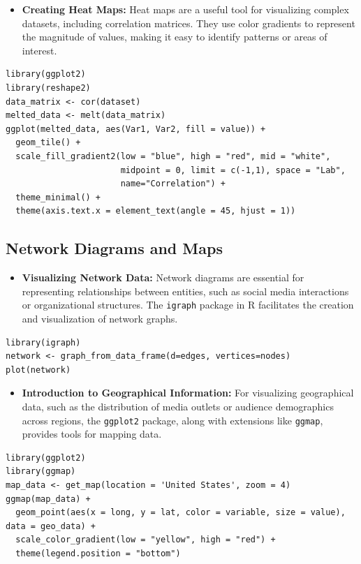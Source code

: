 \documentclass[
]{book}
\providecommand{\tightlist}{%
  \setlength{\itemsep}{0pt}\setlength{\parskip}{0pt}}
\begin{document}
\begin{itemize}
\tightlist
\item
  \textbf{Creating Heat Maps:} Heat maps are a useful tool for visualizing complex datasets, including correlation matrices. They use color gradients to represent the magnitude of values, making it easy to identify patterns or areas of interest.
\end{itemize}

\begin{verbatim}
library(ggplot2)
library(reshape2)
data_matrix <- cor(dataset)
melted_data <- melt(data_matrix)
ggplot(melted_data, aes(Var1, Var2, fill = value)) + 
  geom_tile() + 
  scale_fill_gradient2(low = "blue", high = "red", mid = "white", 
                       midpoint = 0, limit = c(-1,1), space = "Lab", 
                       name="Correlation") +
  theme_minimal() +
  theme(axis.text.x = element_text(angle = 45, hjust = 1))
\end{verbatim}

\hypertarget{network-diagrams-and-maps}{%
\subsection{Network Diagrams and Maps}\label{network-diagrams-and-maps}}

\begin{itemize}
\tightlist
\item
  \textbf{Visualizing Network Data:} Network diagrams are essential for representing relationships between entities, such as social media interactions or organizational structures. The \texttt{igraph} package in R facilitates the creation and visualization of network graphs.
\end{itemize}

\begin{verbatim}
library(igraph)
network <- graph_from_data_frame(d=edges, vertices=nodes)
plot(network)
\end{verbatim}

\begin{itemize}
\tightlist
\item
  \textbf{Introduction to Geographical Information:} For visualizing geographical data, such as the distribution of media outlets or audience demographics across regions, the \texttt{ggplot2} package, along with extensions like \texttt{ggmap}, provides tools for mapping data.
\end{itemize}

\begin{verbatim}
library(ggplot2)
library(ggmap)
map_data <- get_map(location = 'United States', zoom = 4)
ggmap(map_data) + 
  geom_point(aes(x = long, y = lat, color = variable, size = value), data = geo_data) +
  scale_color_gradient(low = "yellow", high = "red") +
  theme(legend.position = "bottom")
\end{verbatim}
\end{document}
